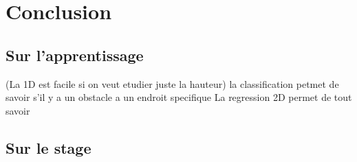
% 



\section{Conclusion}

\subsection{Sur l'apprentissage}
\begin{frame}
(La 1D est facile si on veut etudier juste la hauteur)
la classification petmet de savoir s'il y a un obstacle a un endroit specifique
La regression 2D permet de tout savoir
\end{frame}

\subsection{Sur le stage}

% 
